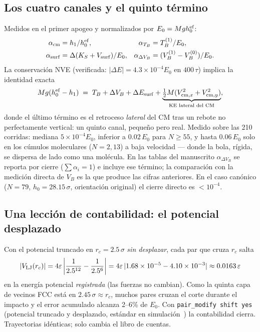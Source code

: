 \documentclass[11pt,a4paper]{article}
\newcommand{\eps}{\varepsilon}
\begin{document}
\subsection{Los cuatro canales y el quinto término}
Medidos en el primer apogeo y normalizados por $E_0 = Mgh_0^{\rm ef}$:
\begin{align}
\alpha_{\rm cm} &= h_1/h_0^{\rm ef}, &
\alpha_{T_B} &= T_B^{(1)}/E_0, \\
\alpha_{\rm surf} &= \Delta(K_S + V_{\rm surf})/E_0, &
\alpha_{\Delta V_B} &= (V_B^{(1)}-V_B^{(0)})/E_0 .
\end{align}
La conservación NVE (verificada: $|\Delta E| = 4.3\times10^{-4} E_0$ en
$400\,\tau$) implica la identidad exacta
\begin{equation}
Mg(h_0^{\rm ef}-h_1) \;=\; T_B + \Delta V_B + \Delta E_{\rm surf}
+ \underbrace{\tfrac12 M (V_{{\rm cm},x}^2+V_{{\rm cm},y}^2)}_{\text{KE
lateral del CM}},
\label{eq:cierre}
\end{equation}
donde el último término es el retroceso \emph{lateral} del CM tras un rebote
no perfectamente vertical: un quinto canal, pequeño pero real. Medido sobre
las 210 corridas: mediana $5\times10^{-4}E_0$, inferior a $0.02\,E_0$ para
$N\ge55$, y hasta $0.06\,E_0$ solo en los cúmulos moleculares ($N=2, 13$) a
baja velocidad --- donde la bola, rígida, se dispersa de lado como una
molécula. En las tablas del manuscrito $\alpha_{\Delta V_B}$ se reporta por
cierre ($\sum\alpha_i = 1$) e incluye ese término; la comparación con la
medición directa de $V_B$ es la que produce las cifras anteriores. En el
caso canónico ($N=79$, $h_0=28.15\,\sigma$, orientación original) el cierre
directo es $<10^{-4}$.

\subsection{Una lección de contabilidad: el potencial desplazado}
Con el potencial truncado en $r_c = 2.5\,\sigma$ \emph{sin desplazar}, cada
par que cruza $r_c$ salta
\begin{equation}
|V_{\rm LJ}(r_c)| = 4\eps\left|\frac{1}{2.5^{12}} - \frac{1}{2.5^{6}}\right|
= 4\eps\,|1.68\times10^{-5} - 4.10\times10^{-3}| \approx 0.0163\,\eps
\end{equation}
en la energía potencial \emph{registrada} (las fuerzas no cambian). Como la
quinta capa de vecinos FCC está en $2.45\,\sigma \approx r_c$, muchos pares
cruzan el corte durante el impacto y el error acumulado alcanza 2--6\% de
$E_0$. Con \texttt{pair\_modify shift yes} (potencial truncado y desplazado,
estándar en simulación~\cite{AllenTildesley,FrenkelSmit}) la contabilidad
cierra. Trayectorias idénticas; solo cambia el libro de cuentas.
\end{document}
